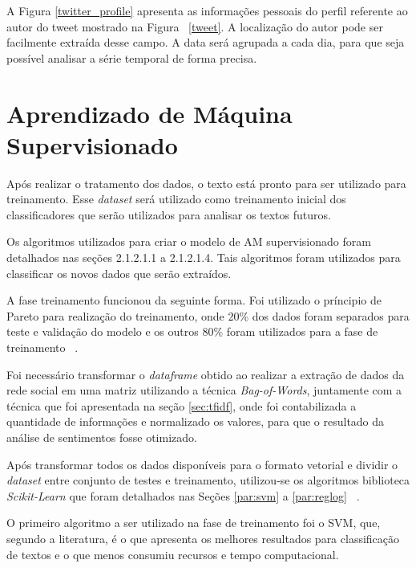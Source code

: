 A Figura \ref{twitter_profile} apresenta as informações pessoais do perfil referente ao autor do tweet mostrado na Figura ~\ref{tweet}. 
A localização do autor pode ser facilmente extraída desse campo. A data será agrupada a cada dia,
 para que seja possível analisar a série temporal de forma precisa.

%

\newpage

\section{Aprendizado de Máquina Supervisionado}
\label{sec:am}

Após realizar o tratamento dos dados, o texto está pronto para ser utilizado para treinamento. Esse \textit{dataset} será utilizado 
como treinamento inicial dos classificadores que serão utilizados para analisar os textos futuros.

Os algoritmos utilizados para criar o modelo de \acrshort{AM} supervisionado foram detalhados nas seções 2.1.2.1.1 a 2.1.2.1.4. Tais algoritmos foram utilizados para classificar os novos dados que serão extraídos.

A fase treinamento funcionou da seguinte forma. Foi utilizado o príncipio de Pareto para realização do treinamento, onde 20\% dos dados foram separados para teste e validação do
modelo e os outros 80\% foram utilizados para a fase de treinamento ~\cite{jin2008pareto}. 



Foi necessário transformar o \textit{dataframe} obtido ao realizar a extração de dados da rede social em uma matriz utilizando a técnica \textit{Bag-of-Words}, 
juntamente com a técnica que foi apresentada na seção \ref{sec:tfidf}, onde foi contabilizada a quantidade de informações e normalizado os valores, para 
que o resultado da análise de sentimentos fosse otimizado.


Após transformar todos os dados disponíveis para o formato vetorial e dividir o \textit{dataset} entre conjunto de testes e treinamento, utilizou-se
os algoritmos biblioteca \textit{Scikit-Learn} que foram detalhados nas Seções \ref{par:svm} a \ref{par:reglog}  ~\cite{pedregosa2011scikit}.


O primeiro algoritmo a ser utilizado na fase de treinamento foi o \acrshort{SVM}, que, segundo a literatura, é o que apresenta os melhores resultados para classificação de textos e o que menos 
consumiu recursos e tempo computacional.


